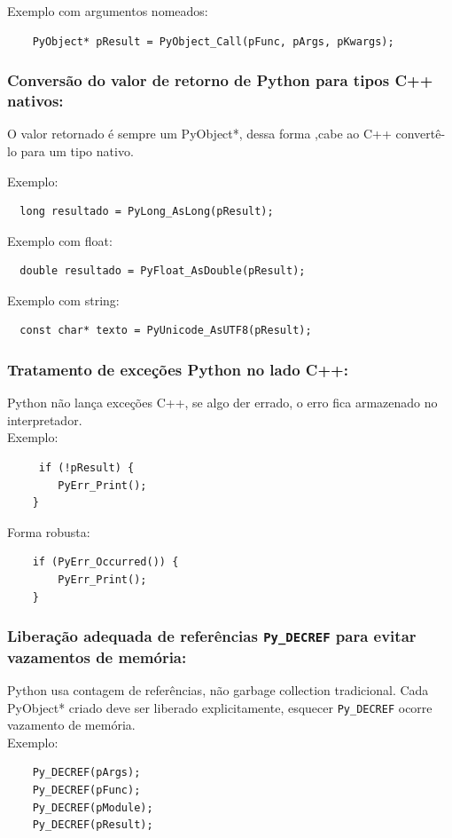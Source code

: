 Exemplo com argumentos nomeados:
\begin{verbatim}
    PyObject* pResult = PyObject_Call(pFunc, pArgs, pKwargs);
\end{verbatim}

    
    \subsubsection{ Conversão do valor de retorno de Python para tipos C++ nativos:} 
    O valor retornado é sempre um PyObject*, dessa forma ,cabe ao C++ convertê-lo para um tipo nativo.

Exemplo:
\begin{verbatim}
  long resultado = PyLong_AsLong(pResult);
\end{verbatim}

Exemplo com float:
\begin{verbatim}
  double resultado = PyFloat_AsDouble(pResult);
\end{verbatim}

Exemplo com string:
\begin{verbatim}
  const char* texto = PyUnicode_AsUTF8(pResult);
\end{verbatim}
    
   \subsubsection {Tratamento de exceções Python no lado C++:}
Python não lança exceções C++, se algo der errado, o erro fica armazenado no interpretador. \\
Exemplo:
\begin{verbatim}
     if (!pResult) {
        PyErr_Print();
    }
\end{verbatim}

Forma robusta:
\begin{verbatim}
    if (PyErr_Occurred()) {
        PyErr_Print();
    }
\end{verbatim}

   
   \subsubsection{ Liberação adequada de referências \texttt{Py\_DECREF} para evitar vazamentos de memória:}
    Python usa contagem de referências, não garbage collection tradicional.
Cada PyObject* criado deve ser liberado explicitamente, esquecer \texttt{Py\_DECREF}  ocorre vazamento de memória.\\
    Exemplo:
    \begin{verbatim}
    Py_DECREF(pArgs);
    Py_DECREF(pFunc);
    Py_DECREF(pModule);
    Py_DECREF(pResult);
\end{verbatim}


